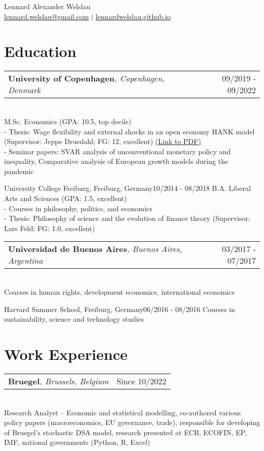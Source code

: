 \documentclass[A4,11pt]{article}
\makeatletter
\newcommand{\Subheading}[5]{   
    \begin{tabular*}{0.97\textwidth}[t]{l@{\extracolsep{\fill}}r}
      \textbf{#1}\textit{\small #2} & \small #3 
      \end{tabular*} \\
      \small #4 \\
    \vspace{7pt}
    }
\makeatother
\begin{document}
\begin{center}
    {\Large Lennard Alexander Welslau} \\ 
    \href{mailto:lennard.welslau@gmail.com}{lennard.welslau@gmail.com} $|$ \href{https://lennardwelslau.github.io/}{lennardwelslau.github.io}

\end{center}


\section{Education}
    \Subheading
        {University of Copenhagen}{, Copenhagen, Denmark}{09/2019 - 09/2022}
        {M.Sc. Economics (GPA: 10.5, top decile) \\
        - Thesis: Wage flexibility and external shocks in an open economy HANK model (Supervisor: Jeppe Druedahl; FG: 12, excellent) \href{https://lennardwelslau.github.io/research/Welslau_MA_Thesis_2022_Wage_Flexibility_Open_Economy_HANK.pdf}{(Link to PDF)}\\
        - Seminar papers: SVAR analysis of unconventional monetary policy and inequality, Comparative analysis of European growth models during the pandemic}

    \Subheading
        {University College Freiburg}{, Freiburg, Germany}{10/2014 - 08/2018}
        {B.A. Liberal Arts and Sciences (GPA: 1.5, excellent) \\
        - Courses in philosophy, politics, and economics \\
        - Thesis: Philosophy of science and the evolution of finance theory (Supervisor: Lars Feld; FG: 1.0, excellent)}

    \Subheading
        {Universidad de Buenos Aires}{, Buenos Aires, Argentina}{03/2017 - 07/2017}
        {Courses in human rights, development economics, international economics}

    \Subheading
        {Harvard Summer School}{, Freiburg, Germany}{06/2016 - 08/2016}
        {Courses in sustainability, science and technology studies}

\section{Work Experience}
    \Subheading
        {Bruegel}{, Brussels, Belgium}{Since 10/2022}
        {Research Analyst -- Economic and statistical modelling, 
        co-authored various policy papers (macroeconomics, EU governance, trade),
        responsible for developing of Bruegel's stochastic DSA model,
        research presented at ECB, ECOFIN, EP, IMF, national governments (Python, R, Excel)}{}
\end{document}
